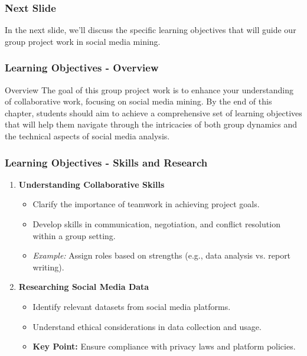 \documentclass{beamer}
\begin{document}
\begin{frame}[fragile]
    \frametitle{Next Slide}
    In the next slide, we'll discuss the specific learning objectives that will guide our group project work in social media mining.
\end{frame}

\begin{frame}[fragile]
    \frametitle{Learning Objectives - Overview}
    \begin{block}{Overview}
        The goal of this group project work is to enhance your understanding of collaborative work, focusing on social media mining. 
        By the end of this chapter, students should aim to achieve a comprehensive set of learning objectives that will help them navigate through the intricacies of both group dynamics and the technical aspects of social media analysis.
    \end{block}
\end{frame}

\begin{frame}[fragile]
    \frametitle{Learning Objectives - Skills and Research}
    \begin{enumerate}
        \item \textbf{Understanding Collaborative Skills}
        \begin{itemize}
            \item Clarify the importance of teamwork in achieving project goals.
            \item Develop skills in communication, negotiation, and conflict resolution within a group setting.
            \item \textit{Example:} Assign roles based on strengths (e.g., data analysis vs. report writing).
        \end{itemize}

        \item \textbf{Researching Social Media Data}
        \begin{itemize}
            \item Identify relevant datasets from social media platforms.
            \item Understand ethical considerations in data collection and usage.
            \item \textbf{Key Point:} Ensure compliance with privacy laws and platform policies.
        \end{itemize}
    \end{enumerate}
\end{frame}
\end{document}
